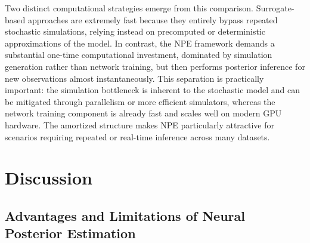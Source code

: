 \documentclass{article}
\providecommand{\DIFaddtex}[1]{{\protect\color{blue} \sf #1}} %
\providecommand{\DIFaddbegin}{} %
\providecommand{\DIFaddend}{} %
\providecommand{\DIFaddbeginFL}{} %
\providecommand{\DIFaddendFL}{} %
\providecommand{\DIFdelendFL}{} %
\providecommand{\DIFadd}[1]{\texorpdfstring{\DIFaddtex{#1}}{#1}} %
\newcommand{\DIFaddincludegraphics}[2][]{{\color{blue}\fbox{\DIFOincludegraphics[#1]{#2}}}} %
\DeclareRobustCommand{\DIFaddbegin}{\DIFOaddbegin \let\includegraphics\DIFaddincludegraphics} %
\DeclareRobustCommand{\DIFaddend}{\DIFOaddend \let\includegraphics\DIFOincludegraphics} %
\DeclareRobustCommand{\DIFaddbeginFL}{\DIFOaddbeginFL \let\includegraphics\DIFaddincludegraphics} %
\DeclareRobustCommand{\DIFaddendFL}{\DIFOaddendFL \let\includegraphics\DIFOincludegraphics} %
\DeclareRobustCommand{\DIFdelendFL}{\DIFOaddendFL \let\includegraphics\DIFOincludegraphics} %
\begin{document}
\begin{table}[htbp]
\DIFdelendFL \DIFaddbeginFL \label{tab:runtimes}
\DIFaddendFL \end{table}

\DIFaddbegin \DIFadd{Two distinct computational strategies emerge from this comparison. Surrogate-based approaches are extremely fast because they entirely bypass repeated stochastic simulations, relying instead on precomputed or deterministic approximations of the model. In contrast, the NPE framework demands a substantial one-time computational investment, dominated by simulation generation rather than network training, but then performs posterior inference for new observations almost instantaneously. This separation is practically important: the simulation bottleneck is inherent to the stochastic model and can be mitigated through parallelism or more efficient simulators, whereas the network training component is already fast and scales well on modern GPU hardware. The amortized structure makes NPE particularly attractive for scenarios requiring repeated or real-time inference across many datasets.
}


\DIFaddend \section{Discussion}\label{sec:discussion}

\subsection{Advantages and Limitations of Neural Posterior Estimation}
\end{document}
